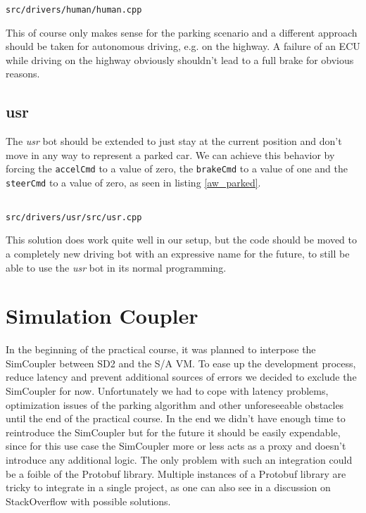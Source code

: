 \documentclass[paper=a4, fontsize=11pt]{scrreprt}
\begin{document}
\begin{listing}[ht]
  \inputminted[firstline=422,linenos=true,lastline=426,gobble=6]{c++}{../../../simulators/speed-dreams/src/drivers/human/human.cpp}
  \caption{\texttt{src/drivers/human/human.cpp}}\label{aw_safety}
\end{listing}

This of course only makes sense for the parking scenario
and a different approach should be taken for autonomous driving, e.g. on the highway.
A failure of an ECU while driving on the highway obviously shouldn't lead to a full brake
for obvious reasons.

\subsection{usr}
The \textit{usr} bot should be extended to just stay at the current position
and don't move in any way to represent a parked car.
We can achieve this behavior by forcing the \texttt{accelCmd} to a value of zero,
the \texttt{brakeCmd} to a value of one and the \texttt{steerCmd} to a value of zero,
as seen in listing \ref{aw_parked}.

\begin{listing}[ht]
  \inputminted[firstline=751,linenos=true,lastline=755,gobble=4]{c++}{../../../simulators/speed-dreams/src/drivers/usr/src/usr.cpp}
  \caption{\texttt{src/drivers/usr/src/usr.cpp}}\label{aw_parked}
\end{listing}

This solution does work quite well in our setup,
but the code should be moved to a completely new driving bot with an expressive name for the future,
to still be able to use the \textit{usr} bot in its normal programming.

\section{Simulation Coupler}
In the beginning of the practical course,
it was planned to interpose the SimCoupler between SD2 and the S/A VM.
To ease up the development process, reduce latency and
prevent additional sources of errors we decided to exclude the SimCoupler for now.
Unfortunately we had to cope with latency problems,
optimization issues of the parking algorithm and other unforeseeable obstacles until the end of the practical course.
In the end we didn't have enough time to reintroduce the SimCoupler
but for the future it should be easily expendable,
since for this use case the SimCoupler more or less acts as a proxy
and doesn't introduce any additional logic.
The only problem with such an integration could be a foible of the Protobuf library.
Multiple instances of a Protobuf library are tricky to integrate in a single project,
as one can also see in a discussion on StackOverflow \cite{soprotobuf} with possible solutions.
\end{document}
